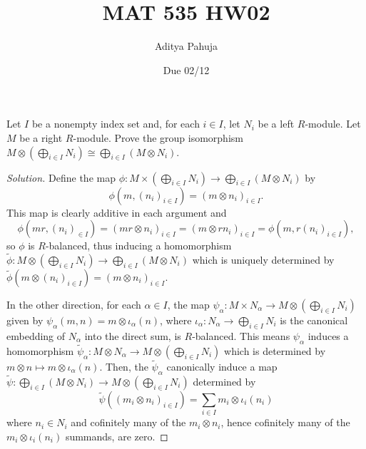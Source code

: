 \documentclass[10pt]{article}
\title{MAT 535 HW02}
\author{\large Aditya Pahuja}
\date{\large Due 02/12}
\newenvironment{soln}{\begin{proof}[Solution]}{\end{proof}}
\begin{document}
\maketitle

\begin{problem}
    [\S10.4\#14]
    Let $I$ be a nonempty index set and, for each $i\in I$,
    let $N_i$ be a left $R$-module. Let $M$ be a right $R$-module.
    Prove the group isomorphism $M\otimes(\bigoplus_{i\in I} N_i)
    \cong\bigoplus_{i\in I}(M\otimes N_i)$.
\end{problem}

\begin{soln}
    Define the map $\phi\colon M\times(\bigoplus_{i\in I} N_i)
    \to \bigoplus_{i\in I}(M\otimes N_i)$ by
    \begin{equation*}
	\phi(m,(n_i)_{i\in I}) = (m\otimes n_i)_{i\in I}.
    \end{equation*}
    This map is clearly additive in each argument and
    \[
	\phi(mr,(n_i)_{\in I}) = (mr\otimes n_i)_{i\in I}
	= (m\otimes rn_i)_{i\in I} = \phi(m,r(n_i)_{i\in I}),
    \]
    so $\phi$ is $R$-balanced, thus inducing a homomorphism
    $\widetilde\phi\colon M\otimes(\bigoplus_{i\in I}N_i)\to
    \bigoplus_{i\in I}(M\otimes N_i)$ which is uniquely determined by
    $\widetilde\phi(m\otimes (n_i)_{i\in I}) = (m\otimes n_i)_{i\in I}$.

    In the other direction, for each $\alpha\in I$, the map
    $\psi_\alpha\colon M\times N_\alpha\to M\otimes(\bigoplus_{i\in I}N_i)$
    given by $\psi_\alpha(m,n) = m\otimes\iota_\alpha(n)$,
    where $\iota_\alpha\colon N_\alpha\to\bigoplus_{i\in I}N_i$
    is the canonical embedding of $N_\alpha$ into the direct sum,
    is $R$-balanced. This means $\psi_\alpha$ induces
    a homomorphism $\widetilde\psi_\alpha\colon M\otimes N_\alpha
    \to M\otimes(\bigoplus_{i\in I}N_i)$ which is determined by
    $m\otimes n\mapsto m\otimes\iota_\alpha(n)$.
    Then, the $\widetilde\psi_\alpha$ canonically induce a map
    $\widetilde\psi\colon\bigoplus_{i\in I}(M\otimes N_i)\to
    M\otimes(\bigoplus_{i\in I}N_i)$ determined by
    \begin{equation*}
	\widetilde\psi((m_i\otimes n_i)_{i\in I})
	= \sum_{i\in I}m_i\otimes \iota_i(n_i)
    \end{equation*}
    where $n_i\in N_i$ and cofinitely many of the
    $m_i\otimes n_i$, hence cofinitely many of
    the $m_i\otimes\iota_i(n_i)$ summands, are zero.


\end{soln}
\end{document}
